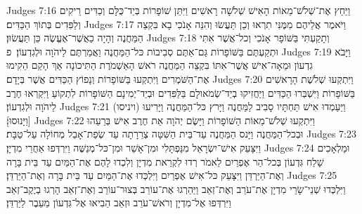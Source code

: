 Judges 7:16	וַיַּחַץ אֶת־שְׁלֹשׁ־מֵאוֹת הָאִישׁ שְׁלֹשָׁה רָאשִׁים וַיִּתֵּן שׁוֹפָרוֹת בְּיַד־כֻּלָּם וְכַדִּים רֵיקִים וְלַפִּדִים בְּתוֹךְ הַכַּדִּים׃
Judges 7:17	וַיֹּאמֶר אֲלֵיהֶם מִמֶּנִּי תִרְאוּ וְכֵן תַּעֲשׂוּ וְהִנֵּה אָנֹכִי בָא בִּקְצֵה הַמַּחֲנֶה וְהָיָה כַאֲשֶׁר־אֶעֱשֶׂה כֵּן תַּעֲשׂוּן׃
Judges 7:18	וְתָקַעְתִּי בַּשּׁוֹפָר אָנֹכִי וְכל־אֲשֶׁר אִתִּי וּתְקַעְתֶּם בַּשּׁוֹפָרוֹת גַּם־אַתֶּם סְבִיבוֹת כּל־הַמַּחֲנֶה וַאֲמַרְתֶּם לַיהֹוָה וּלְגִדְעוֹן׃ {פ}
Judges 7:19	וַיָּבֹא גִדְעוֹן וּמֵאָה־אִישׁ אֲשֶׁר־אִתּוֹ בִּקְצֵה הַמַּחֲנֶה רֹאשׁ הָאַשְׁמֹרֶת הַתִּיכוֹנָה אַךְ הָקֵם הֵקִימוּ אֶת־הַשֹּׁמְרִים וַיִּתְקְעוּ בַּשּׁוֹפָרוֹת וְנָפוֹץ הַכַּדִּים אֲשֶׁר בְּיָדָם׃
Judges 7:20	וַיִּתְקְעוּ שְׁלֹשֶׁת הָרָאשִׁים בַּשּׁוֹפָרוֹת וַיִּשְׁבְּרוּ הַכַּדִּים וַיַּחֲזִיקוּ בְיַד־שְׂמֹאולָם בַּלַּפִּדִים וּבְיַד־יְמִינָם הַשּׁוֹפָרוֹת לִתְקוֹעַ וַיִּקְרְאוּ חֶרֶב לַיהֹוָה וּלְגִדְעוֹן׃
Judges 7:21	וַיַּעַמְדוּ אִישׁ תַּחְתָּיו סָבִיב לַמַּחֲנֶה וַיָּרץ כּל־הַמַּחֲנֶה וַיָּרִיעוּ (ויניסו) [וַיָּנוּסוּ]׃
Judges 7:22	וַיִּתְקְעוּ שְׁלֹשׁ־מֵאוֹת הַשּׁוֹפָרוֹת וַיָּשֶׂם יְהֹוָה אֵת חֶרֶב אִישׁ בְּרֵעֵהוּ וּבְכל־הַמַּחֲנֶה וַיָּנס הַמַּחֲנֶה עַד־בֵּית הַשִּׁטָּה צְרֵרָתָה עַד שְׂפַת־אָבֵל מְחוֹלָה עַל־טַבָּת׃
Judges 7:23	וַיִּצָּעֵק אִישׁ־יִשְׂרָאֵל מִנַּפְתָּלִי וּמִן־אָשֵׁר וּמִן־כּל־מְנַשֶּׁה וַיִּרְדְּפוּ אַחֲרֵי מִדְיָן׃
Judges 7:24	וּמַלְאָכִים שָׁלַח גִּדְעוֹן בְּכל־הַר אֶפְרַיִם לֵאמֹר רְדוּ לִקְרַאת מִדְיָן וְלִכְדוּ לָהֶם אֶת־הַמַּיִם עַד בֵּית בָּרָה וְאֶת־הַיַּרְדֵּן וַיִּצָּעֵק כּל־אִישׁ אֶפְרַיִם וַיִּלְכְּדוּ אֶת־הַמַּיִם עַד בֵּית בָּרָה וְאֶת־הַיַּרְדֵּן׃
Judges 7:25	וַיִּלְכְּדוּ שְׁנֵי־שָׂרֵי מִדְיָן אֶת־עֹרֵב וְאֶת־זְאֵב וַיַּהַרְגוּ אֶת־עוֹרֵב בְּצוּר־עוֹרֵב וְאֶת־זְאֵב הָרְגוּ בְיֶקֶב־זְאֵב וַיִּרְדְּפוּ אֶל־מִדְיָן וְרֹאשׁ־עֹרֵב וּזְאֵב הֵבִיאוּ אֶל־גִּדְעוֹן מֵעֵבֶר לַיַּרְדֵּן׃
